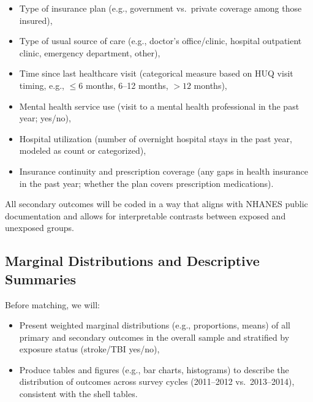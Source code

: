\documentclass{article}
\begin{document}
\begin{itemize}
    \item Type of insurance plan (e.g., government vs.\ private coverage among those insured),

    \item Type of usual source of care (e.g., doctor's office/clinic, hospital outpatient clinic, emergency department, other),

    \item Time since last healthcare visit (categorical measure based on HUQ visit timing, e.g., $\leq 6$ months, 6--12 months, $>12$ months),

    \item Mental health service use (visit to a mental health professional in the past year; yes/no),

    \item Hospital utilization (number of overnight hospital stays in the past year, modeled as count or categorized),

    \item Insurance continuity and prescription coverage (any gaps in health insurance in the past year; whether the plan covers prescription medications).

\end{itemize}

All secondary outcomes will be coded in a way that aligns with NHANES public documentation and allows for interpretable contrasts between exposed and unexposed groups.

\subsection{Marginal Distributions and Descriptive Summaries}

Before matching, we will:

\begin{itemize}
    \item Present weighted marginal distributions (e.g., proportions, means) of all primary and secondary outcomes in the overall sample and stratified by exposure status (stroke/TBI yes/no),

    \item Produce tables and figures (e.g., bar charts, histograms) to describe the distribution of outcomes across survey cycles (2011--2012 vs.\ 2013--2014), consistent with the shell tables.

\end{itemize}
\end{document}
